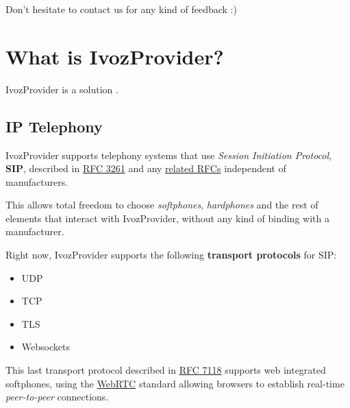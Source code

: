 \documentclass[letterpaper,10pt,english]{sphinxmanual}
\begin{document}
Don't hesitate to contact us for any kind of feedback :)


\section{What is IvozProvider?}
\label{basic_concepts/intro/what_is_ivozprovider::doc}\label{basic_concepts/intro/what_is_ivozprovider:what-is-ivozprovider}
IvozProvider is a {\hyperref[basic_concepts/intro/what_is_ivozprovider:operator\string-oriented]{}}
{\hyperref[basic_concepts/intro/what_is_ivozprovider:multilevel]{}} {\hyperref[basic_concepts/intro/what_is_ivozprovider:voip]{}} solution
{\hyperref[basic_concepts/intro/what_is_ivozprovider:exposed]{}}.


\subsection{IP Telephony}
\label{basic_concepts/intro/what_is_ivozprovider:ip-telephony}\label{basic_concepts/intro/what_is_ivozprovider:voip}
IvozProvider supports telephony systems that use \emph{Session Initiation
Protocol}, \textbf{SIP}, described in \href{https://tools.ietf.org/html/rfc3261}{RFC 3261} and any \href{https://www.packetizer.com/ipmc/sip/standards.html}{related RFCs} independent of
manufacturers.

This allows total freedom to choose \emph{softphones}, \emph{hardphones} and the
rest of elements that interact with IvozProvider, without any kind of
binding with a manufacturer.

Right now, IvozProvider supports the following \textbf{transport protocols}
for SIP:
\begin{itemize}
\item {} 
UDP

\item {} 
TCP

\item {} 
TLS

\item {} 
Websockets

\end{itemize}

This last transport protocol described in \href{https://tools.ietf.org/html/rfc7118}{RFC 7118} supports web integrated
softphones, using the \href{https://webrtc.org/}{WebRTC} standard allowing
browsers to establish real-time \emph{peer-to-peer} connections.
\end{document}

